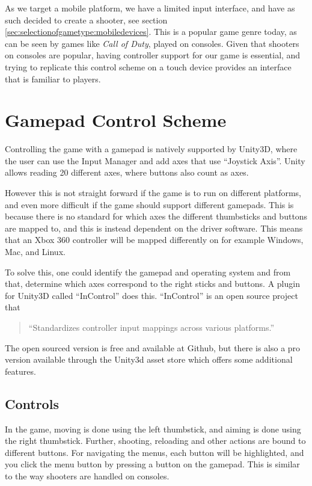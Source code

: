 As we target a mobile platform, we have a limited input interface, and have as such decided to create a shooter, see section \ref{sec:selectionofgametype:mobiledevices}.
This is a popular game genre today, as can be seen by games like \textit{Call of Duty}, played on consoles. 
Given that shooters on consoles are popular, having controller support for our game is essential, and trying to replicate this control scheme on a touch device provides an interface that is familiar to players.\\

\section{Gamepad Control Scheme}
Controlling the game with a gamepad is natively supported by Unity3D, where the user can use the Input Manager \cite{unity_manual_inputmanager} and add axes that use ``Joystick Axis''. Unity allows reading 20 different axes, where buttons also count as axes.

However this is not straight forward if the game is to run on different platforms, and even more difficult if the game should support different gamepads. This is because there is no standard for which axes the different thumbsticks and buttons are mapped to, and this is instead dependent on the driver software. This means that an Xbox 360 controller will be mapped differently on for example Windows, Mac, and Linux.
\cite{unity_wiki_xbox360controller}

To solve this, one could identify the gamepad and operating system and from that, determine which axes correspond to the right sticks and buttons. A plugin for Unity3D called ``InControl''\cite{incontrol_github} does this. ``InControl'' is an open source project that \begin{quote}``Standardizes controller input mappings across various platforms.''\cite{incontrol_website}\end{quote}

The open sourced version is free and available at Github, but there is also a pro version available through the Unity3d asset store\cite{incontrol_assetstore} which offers some additional features.

\subsection{Controls}\label{sec:modules:controlscheme:gamepad:controls}
In the game, moving is done using the left thumbstick, and aiming is done using the right thumbstick.
Further, shooting, reloading and other actions are bound to different buttons.
For navigating the menus, each button will be highlighted, and you click the menu button by pressing a button on the gamepad.
This is similar to the way shooters are handled on consoles.

